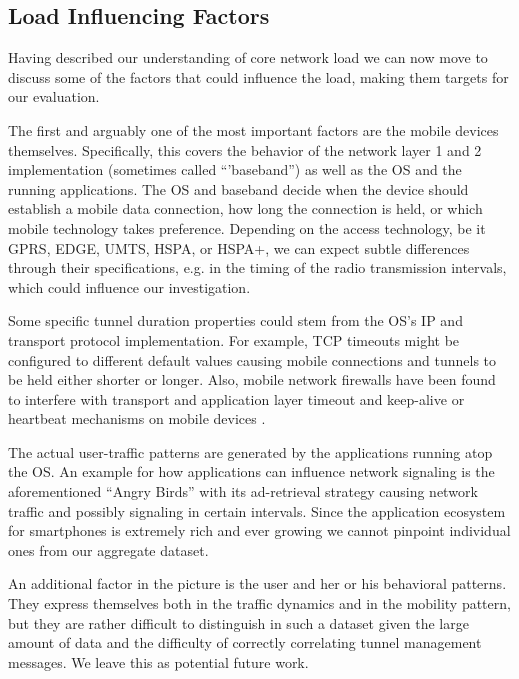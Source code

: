 \subsection{Load Influencing Factors}

Having described our understanding of core network load we can now move to discuss some of the factors that could influence the load, making them targets for our evaluation.

The first and arguably one of the most important factors are the mobile devices themselves. Specifically, this covers the behavior of the network layer 1 and 2 implementation (sometimes called ``'baseband'') as well as the \ac{OS} and the running applications. The OS and baseband decide when the device should establish a mobile data connection, how long the connection is held, or which mobile technology takes preference. Depending on the access technology, be it \acs{GPRS}, \acs{EDGE}, \acs{UMTS}, \acs{HSPA}, or \acs{HSPA+}, we can expect subtle differences through their specifications, e.g. in the timing of the radio transmission intervals, which could influence our investigation. 

Some specific tunnel duration properties could stem from the \ac{OS}'s IP and transport protocol implementation. For example, TCP timeouts might be configured to different default values causing mobile connections and tunnels to be held either shorter or longer. Also, mobile network firewalls have been found to interfere with transport and application layer timeout and keep-alive or heartbeat mechanisms on mobile devices \cite{sigcomm11middleboxes}.

The actual user-traffic patterns are generated by the applications running atop the OS. An example for how applications can influence network signaling is the aforementioned ``Angry Birds'' with its ad-retrieval strategy causing network traffic and possibly signaling in certain intervals. Since the application ecosystem for smartphones is extremely rich and ever growing we cannot pinpoint individual ones from our aggregate dataset.

An additional factor in the picture is the user and her or his behavioral patterns. They express themselves both in the traffic dynamics and in the mobility pattern, but they are rather difficult to distinguish in such a dataset given the large amount of data and the difficulty of correctly correlating tunnel management messages. We leave this as potential future work.

